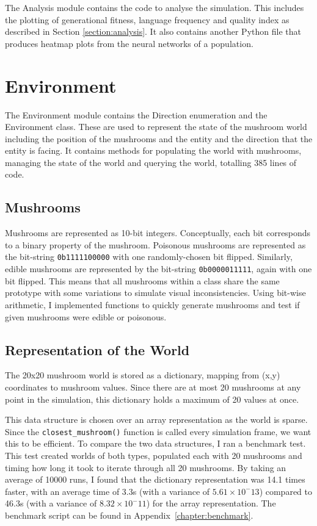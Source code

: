 \documentclass[12pt,a4paper]{report}
\begin{document}
The Analysis module contains the code to analyse the simulation. This includes the plotting of generational fitness, language frequency and quality index as described in Section \ref{section:analysis}. It also contains another Python file that produces heatmap plots from the neural networks of a population.

\section{Environment}\label{section:impl-env}

The Environment module contains the Direction enumeration and the Environment class. These are used to represent the state of the mushroom world including the position of the mushrooms and the entity and the direction that the entity is facing. It contains methods for populating the world with mushrooms, managing the state of the world and querying the world, totalling 385 lines of code.

\subsection{Mushrooms}\label{section:mushrooms}

Mushrooms are represented as 10-bit integers. Conceptually, each bit corresponds to a binary property of the mushroom. Poisonous mushrooms are represented as the bit-string \verb!0b1111100000! with one randomly-chosen bit flipped. Similarly, edible mushrooms are represented by the bit-string \verb~0b0000011111~, again with one bit flipped. This means that all mushrooms within a class share the same prototype with some variations to simulate visual inconsistencies. Using bit-wise arithmetic, I implemented functions to quickly generate mushrooms and test if given mushrooms were edible or poisonous.

\subsection{Representation of the World}

The 20x20 mushroom world is stored as a dictionary, mapping from (x,y) coordinates to mushroom values. Since there are at most 20 mushrooms at any point in the simulation, this dictionary holds a maximum of 20 values at once.

This data structure is chosen over an array representation as the world is sparse. Since the \texttt{closest\_mushroom()} function is called every simulation frame, we want this to be efficient. To compare the two data structures, I ran a benchmark test. This test created worlds of both types, populated each with 20 mushrooms and timing how long it took to iterate through all 20 mushrooms. By taking an average of 10000 runs, I found that the dictionary representation was 14.1 times faster, with an average time of 3.3\textmu s (with a variance of $5.61\times10^-13$) compared to 46.3\textmu s (with a variance of $8.32\times10^-11$) for the array representation. The benchmark script can be found in Appendix~\ref{chapter:benchmark}.
\end{document}

